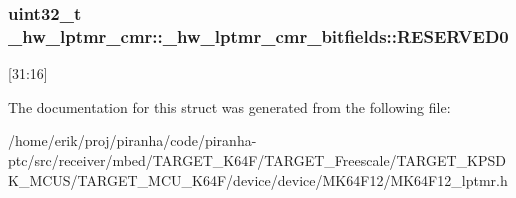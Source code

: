 \subsubsection[{\texorpdfstring{R\+E\+S\+E\+R\+V\+E\+D0}{RESERVED0}}]{\setlength{\rightskip}{0pt plus 5cm}uint32\+\_\+t \+\_\+hw\+\_\+lptmr\+\_\+cmr\+::\+\_\+hw\+\_\+lptmr\+\_\+cmr\+\_\+bitfields\+::\+R\+E\+S\+E\+R\+V\+E\+D0}\hypertarget{struct__hw__lptmr__cmr_1_1__hw__lptmr__cmr__bitfields_af9abddb3bdab11793a9eb4f8fe98212f}{}\label{struct__hw__lptmr__cmr_1_1__hw__lptmr__cmr__bitfields_af9abddb3bdab11793a9eb4f8fe98212f}
\mbox{[}31\+:16\mbox{]} 

The documentation for this struct was generated from the following file\+:\begin{DoxyCompactItemize}
\item 
/home/erik/proj/piranha/code/piranha-\/ptc/src/receiver/mbed/\+T\+A\+R\+G\+E\+T\+\_\+\+K64\+F/\+T\+A\+R\+G\+E\+T\+\_\+\+Freescale/\+T\+A\+R\+G\+E\+T\+\_\+\+K\+P\+S\+D\+K\+\_\+\+M\+C\+U\+S/\+T\+A\+R\+G\+E\+T\+\_\+\+M\+C\+U\+\_\+\+K64\+F/device/device/\+M\+K64\+F12/M\+K64\+F12\+\_\+lptmr.\+h\end{DoxyCompactItemize}
